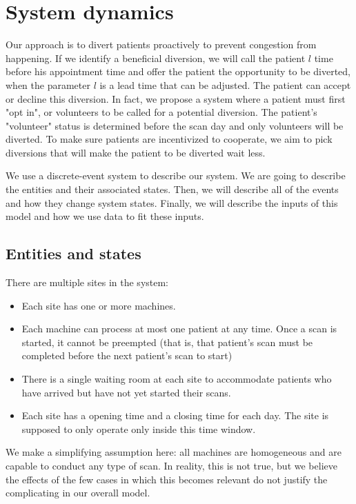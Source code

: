 \section{System dynamics}

Our approach is to divert patients proactively to prevent
congestion from happening. If we identify
a beneficial diversion, we will call the patient $l$ time
before his appointment time and offer the patient
the opportunity to be diverted, when the parameter $l$
is a lead time that can be adjusted. The patient can accept or
decline this diversion. In fact, we propose a system where
a patient must first "opt in", or volunteers to be called
for a potential diversion. The patient's "volunteer" status
is determined before the scan day and only volunteers
will be diverted. To make sure patients
are incentivized to cooperate, we aim to pick diversions
that will make the patient to be diverted wait less.

We use a discrete-event system to describe our system. We are going
to describe the entities and their associated states. Then, we
will describe all of the events and how they change system states.
Finally, we will describe the inputs of this model and how
we use data to fit these inputs.

\subsection{Entities and states}

There are multiple sites in the system:
\begin{itemize}
\item Each site has one or more machines.
\item Each machine can process at most one patient at any time.
  Once a scan is started, it cannot be preempted (that is, that
  patient's scan must be completed before the next patient's
  scan to start)
\item There is a single waiting room at each site to accommodate
      patients who have arrived but have not yet started their scans.
\item Each site has a opening time and a closing time for each day.
      The site is supposed to only operate only inside this time window.
\end{itemize}
We make a simplifying assumption here: all machines are homogeneous
and are capable to conduct any type of scan. In reality, this is not
true, but we believe the effects of the few cases in which this becomes
relevant do not justify the complicating in our overall model.

